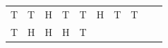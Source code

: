 {\begin{tabular}[t]{|l|l|l|l|l|l|l|l|l|l|}
        T &
        T &
        H &
        T &
        T &
        H &
        T &
        T%
     \tabularnewline\cline{1-1}\cline{2-2}\cline{3-3}\cline{4-4}\cline{5-5}\cline{6-6}\cline{7-7}\cline{8-8}\cline{9-9}\cline{10-10}
        T &
        H &
        H &
        H &
        T &

\end{tabular}}
